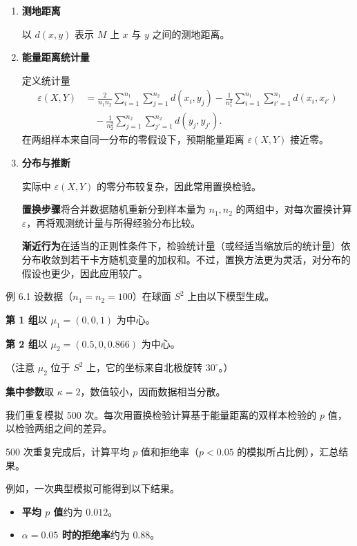 \begin{enumerate}
  \item \textbf{测地距离}\par
  以 $d(x,y)$ 表示 $M$ 上 $x$ 与 $y$ 之间的测地距离。

  \item \textbf{能量距离统计量}\par
  定义统计量
  \[
    \begin{aligned}
      \varepsilon(X,Y)
        &=\frac{2}{n_1 n_2}\sum_{i=1}^{n_1}\sum_{j=1}^{n_2}d(x_i,y_j)
         -\frac{1}{n_1^2}\sum_{i=1}^{n_1}\sum_{i'=1}^{n_1}d(x_i,x_{i'})\\
        &\quad-\frac{1}{n_2^2}\sum_{j=1}^{n_2}\sum_{j'=1}^{n_2}d(y_j,y_{j'}).
    \end{aligned}
  \]
  在两组样本来自同一分布的零假设下，预期能量距离 $\varepsilon(X,Y)$ 接近零。

  \item \textbf{分布与推断}\par
  实际中 $\varepsilon(X,Y)$ 的零分布较复杂，因此常用置换检验。

  \textbf{置换步骤}将合并数据随机重新分到样本量为 $n_1,n_2$ 的两组中，对每次置换计算 $\varepsilon$，再将观测统计量与所得经验分布比较。

  \textbf{渐近行为}在适当的正则性条件下，检验统计量（或经适当缩放后的统计量）依分布收敛到若干卡方随机变量的加权和。不过，置换方法更为灵活，对分布的假设也更少，因此应用较广。
\end{enumerate}

\begin{statement}{例 6.1}{}
设数据（$n_1=n_2=100$）在球面 $S^2$ 上由以下模型生成。

\textbf{第 1 组}以 $\mu_1=(0,0,1)$ 为中心。

\textbf{第 2 组}以 $\mu_2=(0.5,0,0.866)$ 为中心。

（注意 $\mu_2$ 位于 $S^2$ 上，它的坐标来自北极旋转 $30^\circ$。）

\textbf{集中参数}取 $\kappa=2$，数值较小，因而数据相当分散。

我们重复模拟 500 次。每次用置换检验计算基于能量距离的双样本检验的 $p$ 值，以检验两组之间的差异。

500 次重复完成后，计算平均 $p$ 值和拒绝率（$p<0.05$ 的模拟所占比例），汇总结果。

例如，一次典型模拟可能得到以下结果。
\begin{itemize}
  \item \textbf{平均 $p$ 值}约为 $0.012$。
  \item \textbf{$\alpha=0.05$ 时的拒绝率}约为 $0.88$。
\end{itemize}
\end{statement}
